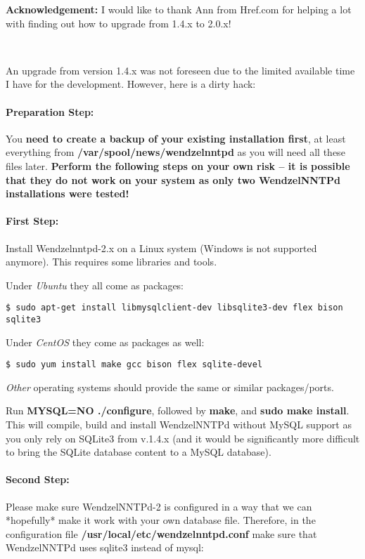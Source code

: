 \textbf{Acknowledgement:} I would like to thank Ann from Href.com for helping a lot with finding out how to upgrade from 1.4.x to 2.0.x!

~

An upgrade from version 1.4.x was not foreseen due to the limited available time I have for the development. However, here is a dirty hack:

\paragraph*{Preparation Step:} You \textbf{need to create a backup of your existing installation first}, at least everything from \textbf{/var/spool/news/wendzelnntpd} as you will need all these files later. \textbf{Perform the following steps on your own risk -- it is possible that they do not work on your system as only two WendzelNNTPd installations were tested!}

\paragraph*{First Step:} Install Wendzelnntpd-2.x on a Linux system (Windows is not supported anymore). This requires some libraries and tools.

Under \textit{Ubuntu} they all come as packages:
\begin{verbatim}
$ sudo apt-get install libmysqlclient-dev libsqlite3-dev flex bison sqlite3
\end{verbatim}

Under \textit{CentOS} they come as packages as well:
\begin{verbatim}
$ sudo yum install make gcc bison flex sqlite-devel
\end{verbatim}

\textit{Other} operating systems should provide the same or similar packages/ports.

Run \textbf{MYSQL=NO ./configure}, followed by \textbf{make}, and \textbf{sudo make install}. This will compile, build and install WendzelNNTPd without MySQL support as you only rely on SQLite3 from v.1.4.x (and it would be significantly more difficult to bring the SQLite database content to a MySQL database).

\paragraph*{Second Step:} Please make sure WendzelNNTPd-2 is configured in a way that we can *hopefully* make it work with your own database file. Therefore, in the configuration file \textbf{/usr/local/etc/wendzelnntpd.conf} make sure that WendzelNNTPd uses sqlite3 instead of mysql:

